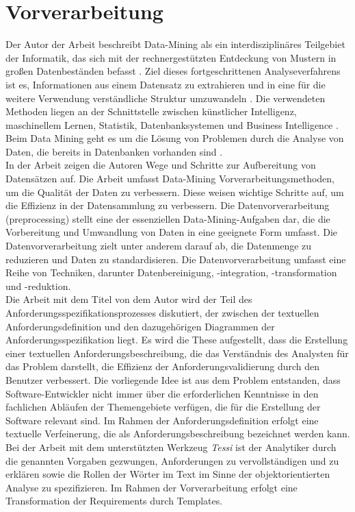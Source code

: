 \section{Vorverarbeitung}
Der Autor \citeauthor{jain2013data} der Arbeit \cite{jain2013data} beschreibt Data-Mining als ein interdisziplinäres Teilgebiet der Informatik, das sich mit der rechnergestützten Entdeckung von Mustern in großen Datenbeständen befasst \cite{jain2013data}. Ziel dieses fortgeschrittenen Analyseverfahrens ist es, Informationen aus einem Datensatz zu extrahieren und in eine für die weitere Verwendung verständliche Struktur umzuwandeln \cite{jain2013data}. Die verwendeten Methoden liegen an der Schnittstelle zwischen künstlicher Intelligenz, maschinellem Lernen, Statistik, Datenbanksystemen und Business Intelligence \cite{jain2013data}. Beim Data Mining geht es um die Lösung von Problemen durch die Analyse von Daten, die bereits in Datenbanken vorhanden sind \cite{jain2013data}.\\

In der Arbeit \cite{alasadi2017review} zeigen die Autoren \citeauthor{alasadi2017review} Wege und Schritte zur Aufbereitung von Datensätzen auf. Die Arbeit umfasst Data-Mining Vorverarbeitungsmethoden, um die Qualität der Daten zu verbessern. Diese weisen wichtige Schritte auf, um die Effizienz in der Datensammlung zu verbessern. Die Datenvorverarbeitung (preprocessing) stellt eine der essenziellen Data-Mining-Aufgaben dar, die die Vorbereitung und Umwandlung von Daten in eine geeignete Form umfasst. Die Datenvorverarbeitung zielt unter anderem darauf ab, die Datenmenge zu reduzieren und Daten zu standardisieren. Die Datenvorverarbeitung umfasst eine Reihe von Techniken, darunter Datenbereinigung, -integration, -transformation und -reduktion. \\

Die Arbeit mit dem Titel \cite{kroha2000preprocessing} von dem Autor \citeauthor{kroha2000preprocessing} wird der Teil des Anforderungsspezifikationsprozesses diskutiert, der zwischen der textuellen Anforderungsdefinition und den dazugehörigen Diagrammen der Anforderungsspezifikation liegt. Es wird die These aufgestellt, dass die Erstellung einer textuellen Anforderungsbeschreibung, die das Verständnis des Analysten für das Problem darstellt, die Effizienz der Anforderungsvalidierung durch den Benutzer verbessert. Die vorliegende Idee ist aus dem Problem entstanden, dass Software-Entwickler nicht immer über die erforderlichen Kenntnisse in den fachlichen Abläufen der Themengebiete verfügen, die für die Erstellung der Software relevant sind. Im Rahmen der Anforderungsdefinition erfolgt eine textuelle Verfeinerung, die als Anforderungsbeschreibung bezeichnet werden kann. Bei der Arbeit mit dem unterstützten Werkzeug \emph{Tessi} ist der Analytiker durch die genannten Vorgaben gezwungen, Anforderungen zu vervollständigen und zu erklären sowie die Rollen der Wörter im Text im Sinne der objektorientierten Analyse zu spezifizieren. Im Rahmen der Vorverarbeitung erfolgt eine Transformation der Requirements durch Templates.
